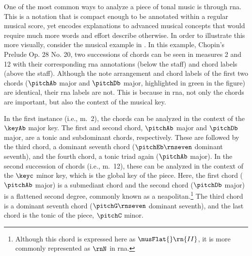 
One of the most common ways to analyze a piece of tonal
music is through \gls{rna}. This is a notation that is
compact enough to be annotated within a regular musical
score, yet encodes explanations to advanced musical concepts
that would require much more words and effort describe
otherwise. In order to illustrate this more visually,
consider the musical example in
. In this example, Chopin's
Prelude Op. 28 No. 20, two successions of chords can be seen
in measures 2 and 12 with their corresponding \gls{rna}
annotations (below the staff) and chord labels (above the
staff). Although the note arrangement and chord labels of
the first two chords ($\pitchAb$ major and $\pitchDb$ major,
highlighted in green in the figure) are identical, their
\gls{rna} labels are not. This is because in \gls{rna}, not
only the chords are important, but also the context of the
musical key.


In the first instance (i.e., m.~2), the chords can be
analyzed in the context of the $\keyAb$ major key. The first
and second chord, $\pitchAb$ major and $\pitchDb$ major, are
a tonic and subdominant chords, respectively. These are
followed by the third chord, a dominant seventh chord
($\pitchEb\rnseven$ dominant seventh), and the fourth chord,
a tonic triad again ($\pitchAb$ major). In the second
succession of chords (i.e., m.~12), these can be analyzed in
the context of the $\keyc$ minor key, which is the global
key of the piece. Here, the first chord ($\pitchAb$ major)
is a submediant chord and the second chord ($\pitchDb$
major) is a flattened second degree, commonly known as a
\gls{neapolitan}.\footnote{Although this chord is expressed
here as $\musFlat{}\rn{II}$, it is more commonly represented
as $\rnN$ in \gls{rna}.} The third chord is a dominant
seventh chord ($\pitchG\rnseven$ dominant seventh), and the
last chord is the tonic of the piece, $\pitchC$ minor.

